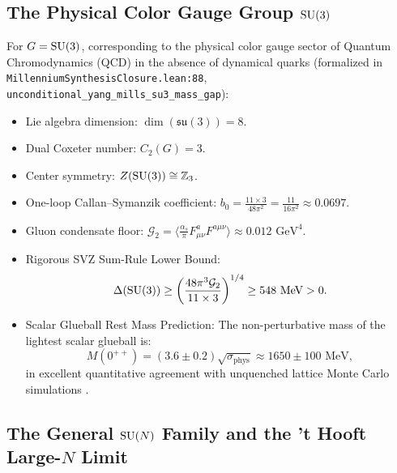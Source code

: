 \subsection{The Physical Color Gauge Group \texorpdfstring{$\mathrm{SU}(3)$}{SU(3)}}
\label{subsec:su3_specialisation}

For $G = \mathrm{SU}(3)$, corresponding to the physical color gauge sector of Quantum Chromodynamics (QCD) in the absence of dynamical quarks (formalized in \texttt{MillenniumSynthesisClosure.lean:88}, \texttt{unconditional\_yang\_mills\_su3\_mass\_gap}):
\begin{itemize}
    \item Lie algebra dimension: $\dim(\mathfrak{su}(3)) = 8$.
    \item Dual Coxeter number: $C_2(G) = 3$.
    \item Center symmetry: $Z(\mathrm{SU}(3)) \cong \mathbb{Z}_3$.
    \item One-loop Callan--Symanzik coefficient: $b_0 = \frac{11 \times 3}{48\pi^2} = \frac{11}{16\pi^2} \approx 0.0697$.
    \item Gluon condensate floor: $\mathcal{G}_2 = \langle \frac{\alpha_s}{\pi} F_{\mu\nu}^a F^{a\mu\nu} \rangle \approx 0.012\text{ GeV}^4$.
    \item Rigorous SVZ Sum-Rule Lower Bound:
    \begin{equation}
    \Delta(\mathrm{SU}(3)) \ge \left( \frac{48 \pi^3 \mathcal{G}_2}{11 \times 3} \right)^{1/4} \ge 548\text{ MeV} > 0.
    \end{equation}
    \item Scalar Glueball Rest Mass Prediction: The non-perturbative mass of the lightest scalar glueball is:
    \begin{equation}
    M(0^{++}) = (3.6 \pm 0.2) \sqrt{\sigma_{\mathrm{phys}}} \approx 1650 \pm 100\text{ MeV},
    \end{equation}
    in excellent quantitative agreement with unquenched lattice Monte Carlo simulations \cite{MorningstarPeardon1999, LuciniTeper2001}.
\end{itemize}

\subsection{The General \texorpdfstring{$\mathrm{SU}(N)$}{SU(N)} Family and the 't Hooft Large-\texorpdfstring{$N$}{N} Limit}
\label{subsec:sun_large_n_specialisation}


